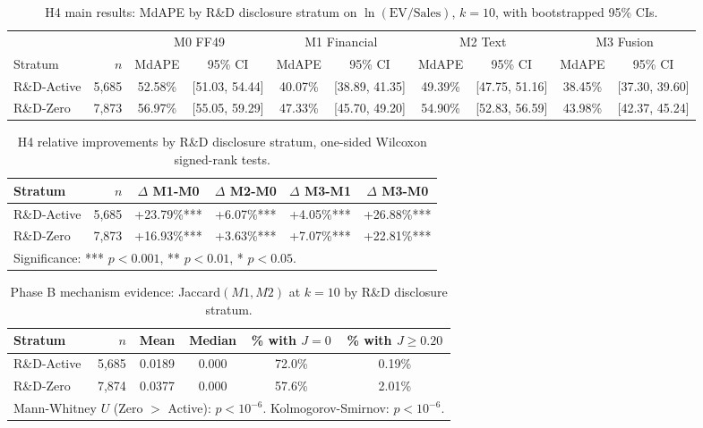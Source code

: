 
\begin{table}[ht]
\centering
\caption{H4 main results: MdAPE by R\&D disclosure stratum on $\ln(\textrm{EV}/\textrm{Sales})$, $k = 10$, with bootstrapped 95\% CIs.}
\label{tab:h4_main}
\small
\begin{tabular}{lr cc cc cc cc}
\toprule
 & & \multicolumn{2}{c}{M0 FF49} & \multicolumn{2}{c}{M1 Financial} & \multicolumn{2}{c}{M2 Text} & \multicolumn{2}{c}{M3 Fusion} \\
\cmidrule(lr){3-4} \cmidrule(lr){5-6} \cmidrule(lr){7-8} \cmidrule(lr){9-10}
Stratum & $n$ & MdAPE & 95\% CI & MdAPE & 95\% CI & MdAPE & 95\% CI & MdAPE & 95\% CI \\
\midrule
  R\&D-Active   & 5,685 & 52.58\% & [51.03, 54.44] & 40.07\% & [38.89, 41.35] & 49.39\% & [47.75, 51.16] & 38.45\% & [37.30, 39.60] \\
  R\&D-Zero     & 7,873 & 56.97\% & [55.05, 59.29] & 47.33\% & [45.70, 49.20] & 54.90\% & [52.83, 56.59] & 43.98\% & [42.37, 45.24] \\
\bottomrule
\end{tabular}
\end{table}

\begin{table}[ht]
\centering
\caption{H4 relative improvements by R\&D disclosure stratum, one-sided Wilcoxon signed-rank tests.}
\label{tab:h4_deltas}
\small
\begin{tabular}{lrcccc}
\toprule
Stratum & $n$ & $\Delta$ M1-M0 & $\Delta$ M2-M0 & $\Delta$ M3-M1 & $\Delta$ M3-M0 \\
\midrule
  R\&D-Active   & 5,685 & +23.79\%*** & +6.07\%*** & +4.05\%*** & +26.88\%*** \\
  R\&D-Zero     & 7,873 & +16.93\%*** & +3.63\%*** & +7.07\%*** & +22.81\%*** \\
\bottomrule
\multicolumn{6}{l}{\footnotesize Significance: *** $p<0.001$, ** $p<0.01$, * $p<0.05$.} \\
\end{tabular}
\end{table}

\begin{table}[ht]
\centering
\caption{Phase B mechanism evidence: Jaccard$(M1, M2)$ at $k=10$ by R\&D disclosure stratum.}
\label{tab:h4_jaccard}
\small
\begin{tabular}{lrcccc}
\toprule
Stratum & $n$ & Mean & Median & \% with $J = 0$ & \% with $J \geq 0.20$ \\
\midrule
  R\&D-Active   & 5,685 & 0.0189 & 0.000 & 72.0\% & 0.19\% \\
  R\&D-Zero     & 7,874 & 0.0377 & 0.000 & 57.6\% & 2.01\% \\
\bottomrule
\multicolumn{6}{l}{\footnotesize Mann-Whitney $U$ (Zero $>$ Active): $p < 10^{-6}$. Kolmogorov-Smirnov: $p < 10^{-6}$.} \\
\end{tabular}
\end{table}
